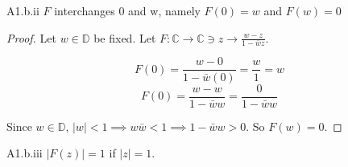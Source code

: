 \documentclass{article}
\newcommand{\C}{\mathbb{C}}
\begin{document}
\begin{claim}{A1.b.ii}\label{Claim 3bii.}
    $F$ interchanges 0 and w, namely $F(0) = w$ and $F(w) = 0$
\end{claim}
\begin{proof}
    Let $w \in \mathbb{D}$ be fixed. Let $F: \C \to \C \ni z \to \frac{w - z}{1 - \bar{w}z}$.

    \[F(0) = \frac{w - 0}{1 - \bar{w}(0)} = \frac{w}{1} = w\]
    \[F(0) = \frac{w - w}{1 - \bar{w}w} = \frac{0}{1 - \bar{w}w}\]

    Since $w \in \mathbb{D}$, $|w| < 1 \implies w\bar{w} < 1 \implies 1 - \bar{w}{w} > 0$. So $F(w) = 0$.   
\end{proof}

\begin{claim}{A1.b.iii}\label{Claim 3biii.}
    $|F(z)| = 1$ if $|z| = 1$.
\end{claim}
\end{document}

